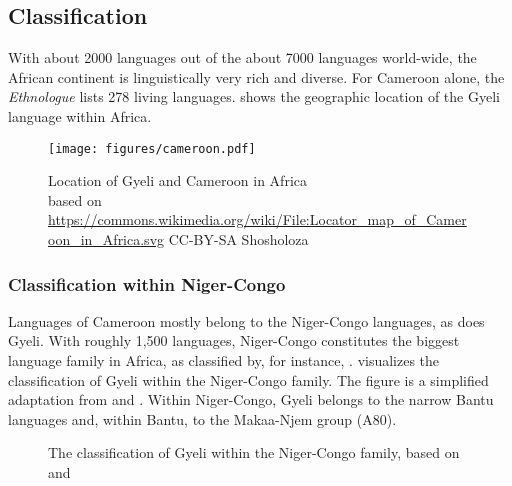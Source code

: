 \largerpage
\subsection{Classification}
With about 2000 languages out of the about 7000 languages world-wide, the African continent is linguistically very rich and diverse. For Cameroon alone, the \textit{Ethnologue} lists 278 living languages.  shows the geographic location of the Gyeli language within Africa.

\begin{figure}
\texttt{[image: figures/cameroon.pdf]}
\caption{Location of Gyeli and Cameroon in Africa\\{\tiny based on \url{https://commons.wikimedia.org/wiki/File:Locator_map_of_Cameroon_in_Africa.svg} CC-BY-SA Shosholoza }}
\label{Fig:Gyeli-Africa}
\end{figure}




\subsubsection*{Classification within Niger-Congo} Languages of Cameroon mostly belong to the Niger-Congo languages, as does Gyeli. With roughly 1,500 languages, Niger-Congo constitutes the biggest language family in Africa, as classified by, for instance, \citet{williamson2000}.  visualizes the classification of Gyeli within the Niger-Congo family. The figure is a simplified adaptation from \citet{williamson2000} and \citet{lewis09}. Within Niger-Congo, Gyeli belongs to the narrow Bantu languages and, within Bantu, to the Makaa-Njem group (A80). 



\begin{figure}
\caption {The classification of Gyeli within the Niger-Congo family, based on \citet{williamson2000} and \citet{lewis09}}
\label {Fig:ClassBantu}
\end {figure}


